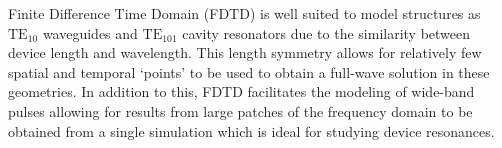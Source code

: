 Finite Difference Time Domain (FDTD) is well suited to model structures as $\mathrm{TE_{10}}$ waveguides and $\mathrm{TE_{101}}$ cavity resonators due to the similarity between device length and wavelength. This length symmetry allows for relatively few spatial and temporal `points' to be used to obtain a full-wave solution in these geometries. In addition to this, FDTD facilitates the modeling of wide-band pulses allowing for results from large patches of the frequency domain to be obtained from a single simulation which is ideal for studying device resonances.